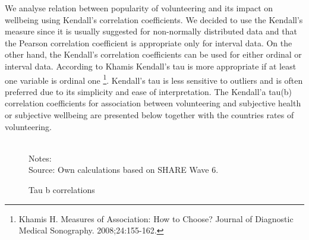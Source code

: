 \documentclass[10pt, letterpaper]{article}
\begin{document}
\begin{spacing}{1.4}
We analyse relation between popularity of volunteering and its impact on wellbeing using Kendall's correlation coefficients. We decided to use the Kendall's measure since it is usually suggested for non-normally distributed data and that the Pearson correlation coefficient is appropriate only for interval data. On the other hand, the Kendall's correlation coefficients can be used for either ordinal or interval data. According to Khamis  Kendall's tau is more appropriate if at least one variable is ordinal one \footnote{Khamis H. Measures of Association: How to Choose? Journal of Diagnostic Medical Sonography. 2008;24:155-162.}. Kendall's tau is less sensitive to outliers and is often preferred due to its simplicity and ease of interpretation. The Kendall'a tau(b) correlation coefficients for association between volunteering and subjective health or subjective wellbeing  are presented below together with the countries rates of volunteering.


\begin{figure}[H]
\centering
\caption{Tau b correlations} 
\label{fig:taub}
\begin{minipage}{1\linewidth}
\quad
{}~\\
{\footnotesize Notes: }~\\
{\footnotesize Source: Own calculations based on SHARE Wave 6.}
\end{minipage}
\end{figure} 


\end{spacing}
\end{document}
